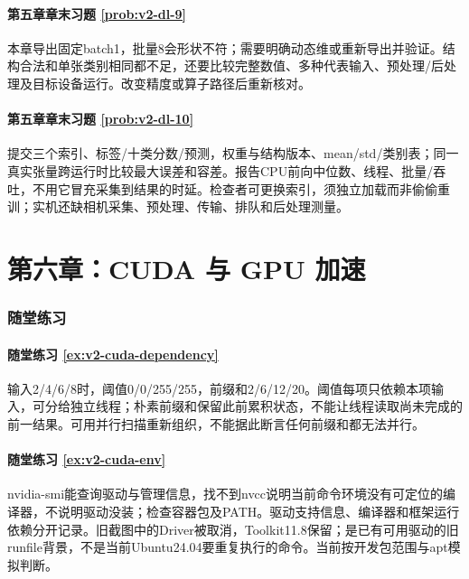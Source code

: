 \paragraph*{第五章章末习题 \ref{prob:v2-dl-9}}
\begin{solution}
本章导出固定batch1，批量8会形状不符；需要明确动态维或重新导出并验证。结构合法和单张类别相同都不足，还要比较完整数值、多种代表输入、预处理/后处理及目标设备运行。改变精度或算子路径后重新核对。
\end{solution}
\paragraph*{第五章章末习题 \ref{prob:v2-dl-10}}
\begin{solution}
提交三个索引、标签/十类分数/预测，权重与结构版本、mean/std/类别表；同一真实张量跨运行时比较最大误差和容差。报告CPU前向中位数、线程、批量/吞吐，不用它冒充采集到结果的时延。检查者可更换索引，须独立加载而非偷偷重训；实机还缺相机采集、预处理、传输、排队和后处理测量。
\end{solution}

\section*{第六章：CUDA 与 GPU 加速}
{}
\subsubsection*{随堂练习}

\paragraph*{随堂练习 \ref{ex:v2-cuda-dependency}}
\begin{solution}
输入2/4/6/8时，阈值0/0/255/255，前缀和2/6/12/20。阈值每项只依赖本项输入，可分给独立线程；朴素前缀和保留此前累积状态，不能让线程读取尚未完成的前一结果。可用并行扫描重新组织，不能据此断言任何前缀和都无法并行。
\end{solution}

\paragraph*{随堂练习 \ref{ex:v2-cuda-env}}
\begin{solution}
nvidia-smi能查询驱动与管理信息，找不到nvcc说明当前命令环境没有可定位的编译器，不说明驱动没装；检查容器包及PATH。驱动支持信息、编译器和框架运行依赖分开记录。旧截图中的Driver被取消，Toolkit11.8保留；是已有可用驱动的旧runfile背景，不是当前Ubuntu24.04要重复执行的命令。当前按开发包范围与apt模拟判断。
\end{solution}

